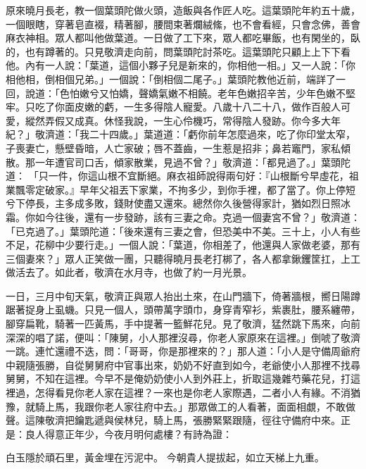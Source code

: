 原來曉月長老，教一個葉頭陀做火頭，造飯與各作匠人吃。這葉頭陀年約五十歲，一個眼瞎，穿著皂直裰，精著腳，腰間束著爛絨絛，也不會看經，只會念佛，善會麻衣神相。眾人都叫他做葉道。一日做了工下來，眾人都吃畢飯，也有閑坐的，臥的，也有蹲著的。只見敬濟走向前，問葉頭陀討茶吃。這葉頭陀只顧上上下下看他。內有一人說：「葉道，這個小夥子兒是新來的，你相他一相。」又一人說：「你相他相，倒相個兄弟。」一個說：「倒相個二尾子。」葉頭陀教他近前，端詳了一回，說道：「色怕嫩兮又怕嬌，聲嬌氣嫩不相饒。老年色嫩招辛苦，少年色嫩不堅牢。只吃了你面皮嫩的虧，一生多得陰人寵愛。八歲十八二十八，做作百般人可愛，縱然弄假又成真。休怪我說，一生心伶機巧，常得陰人發跡。你今多大年紀？」敬濟道：「我二十四歲。」葉道道：「虧你前年怎麼過來，吃了你印堂太窄，子喪妻亡，懸壁昏暗，人亡家破；唇不蓋齒，一生惹是招非；鼻若竈門，家私傾散。那一年遭官司口舌，傾家散業，見過不曾？」敬濟道：「都見過了。」葉頭陀道： 「只一件，你這山根不宜斷絕。麻衣祖師說得兩句好：『山根斷兮早虛花，祖業飄零定破家。』早年父祖丟下家業，不拘多少，到你手裡，都了當了。你上停短兮下停長，主多成多敗，錢財使盡又還來。總然你久後營得家計，猶如烈日照冰霜。你如今往後，還有一步發跡，該有三妻之命。克過一個妻宮不曾？」敬濟道：「已克過了。」葉頭陀道：「後來還有三妻之會，但恐美中不美。三十上，小人有些不足，花柳中少要行走。」一個人說：「葉道，你相差了，他還與人家做老婆，那有三個妻來？」眾人正笑做一團，只聽得曉月長老打梆了，各人都拿鍬钁筐扛，上工做活去了。如此者，敬濟在水月寺，也做了約一月光景。

一日，三月中旬天氣，敬濟正與眾人抬出土來，在山門牆下，倚著牆根，嚮日陽蹲踞著捉身上虱蟣。只見一個人，頭帶萬字頭巾，身穿青窄衫，紫裹肚，腰系纏帶，腳穿扁靴，騎著一匹黃馬，手中提著一籃鮮花兒。見了敬濟，猛然跳下馬來，向前深深的唱了諾，便叫：「陳舅，小人那裡沒尋，你老人家原來在這裡。」倒唬了敬濟一跳。連忙還禮不迭，問：「哥哥，你是那裡來的？」那人道：「小人是守備周爺府中親隨張勝，自從舅舅府中官事出來，奶奶不好直到如今，老爺使小人那裡不找尋舅舅，不知在這裡。今早不是俺奶奶使小人到外莊上，折取這幾雜芍藥花兒，打這裡過，怎得看見你老人家在這裡？一來也是你老人家際遇，二者小人有緣。不消猶豫，就騎上馬，我跟你老人家往府中去。」那眾做工的人看著，面面相覷，不敢做聲。這陳敬濟把鑰匙遞與侯林兒，騎上馬，張勝緊緊跟隨，徑往守備府中來。正是：良人得意正年少，今夜月明何處樓？有詩為證：

白玉隱於頑石里，黃金埋在污泥中。
今朝貴人提拔起，如立天梯上九重。

